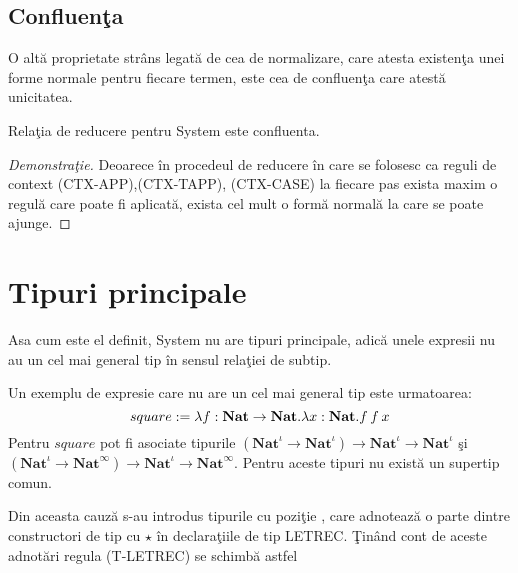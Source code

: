 \subsection{Confluen\c ta}
O alt\u a proprietate str\^ ans legat\u a  de cea de normalizare, care atesta existen\c ta unei forme normale pentru fiecare termen, este cea de confluen\c ta care atest\u a unicitatea.

\begin{corollary}
Rela\c tia de reducere pentru System \fhat este confluenta.
\end{corollary}
\begin{proof}[Demonstra\c tie]
Deoarece \^ in procedeul de reducere \^ in care se folosesc ca reguli de context {\scriptsize (CTX-APP),(CTX-TAPP), (CTX-CASE)} la fiecare pas exista maxim o regul\u a care poate fi aplicat\u a,  exista cel mult o form\u a normal\u a la care se poate ajunge.
\end{proof}

\section{Tipuri principale}
\label{tip_princ}
\done{}
Asa cum este el definit, System \fhat nu are tipuri principale, adic\u a unele expresii nu au un cel mai general tip \^ in sensul rela\c tiei de subtip.
\begin{example}
Un exemplu de expresie care nu are un cel mai general tip este urmatoarea:
$$square := \lambda f : \textbf{Nat} \to \textbf{Nat}. \lambda x : \textbf{Nat}. f \app f\app x$$
Pentru $square$ pot fi asociate tipurile $(\textbf{Nat}^\iota \to \textbf{Nat}^\iota) \to \textbf{Nat}^\iota \to \textbf{Nat}^\iota$ \c si $(\textbf{Nat}^\iota \to \textbf{Nat}^\infty) \to \textbf{Nat}^\iota \to \textbf{Nat}^\infty$. Pentru aceste tipuri nu exist\u a un supertip comun.
\end{example}

Din aceasta cauz\u a s-au introdus tipurile cu pozi\c tie \citep{1614481}, care adnoteaz\u a o parte dintre constructori de tip cu $\star$ \^ in declara\c tiile de tip LETREC. \c Tin\^ and cont de aceste adnot\u ari regula {\scriptsize (T-LETREC)} se schimb\u a astfel

\begin{prooftree}

\end{prooftree}

